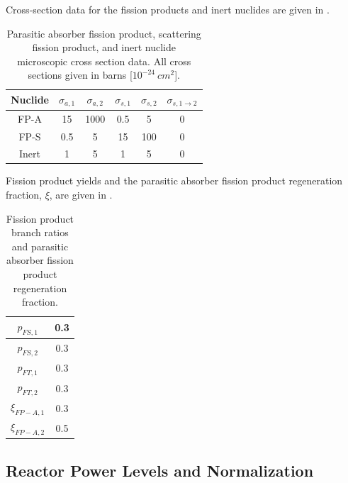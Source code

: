 Cross-section data for the fission products and inert nuclides are given in .
\begin{table}[!htp]
\begin{center}
\begin{tabular}{|c|c|c|c|c|c|}
\hline
Nuclide  & $\sigma_{a,1}$ & $\sigma_{a,2}$	& $\sigma_{s,1}$	& $\sigma_{s,2}$ & $\sigma_{s,1\to2} $\\
\hline
FP-A & 15  & 1000  & 0.5  & 5 & 0 \\
\hline
FP-S  & 0.5  & 5  & 15  & 100 & 0 \\
\hline
Inert & 1 & 5  & 1 & 5 & 0 \\
\hline
\end{tabular}
\end{center}
\caption{Parasitic absorber fission product, scattering fission product, and inert nuclide microscopic cross section data.  All cross sections given in barns [$10^{-24}~cm^2$].}
\label{tbl:fp-data}
\end{table}
Fission product yields and the parasitic absorber fission product regeneration fraction, $\xi$, are given in .
\begin{table}[!htp]
\begin{center}
\begin{tabular}{|c|c|}
\hline
$p_{FS,1} $& 0.3\\
\hline
$p_{FS,2} $& 0.3\\
\hline
$p_{FT,1} $& 0.3\\
\hline
$p_{FT,2}$ & 0.3\\
\hline
$\xi_{FP-A,1}$ & 0.3 \\
\hline
$\xi_{FP-A,2}$ & 0.5\\
\hline
\end{tabular}
\end{center}
\caption{Fission product branch ratios and parasitic absorber fission product regeneration fraction.}
\label{tbl:fp_misc}
\end{table}

\subsection{Reactor Power Levels and Normalization}

